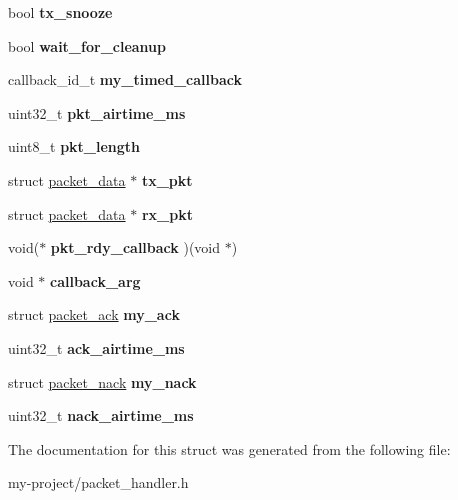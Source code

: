 \begin{DoxyCompactItemize}
bool {\bfseries tx\+\_\+snooze}
\item 
\mbox{\label{structpacket__handler_a2aadb3d86eb35855017bcd6d8691ff3e}} 
bool {\bfseries wait\+\_\+for\+\_\+cleanup}
\item 
\mbox{\label{structpacket__handler_abbef57602dd517871e774e639135ce30}} 
callback\+\_\+id\+\_\+t {\bfseries my\+\_\+timed\+\_\+callback}
\item 
\mbox{\label{structpacket__handler_af9c15e3494d3d3eb7a47d45b69862ebf}} 
uint32\+\_\+t {\bfseries pkt\+\_\+airtime\+\_\+ms}
\item 
\mbox{\label{structpacket__handler_a4292ab96a00dc1506d1cc38fb71fb8d6}} 
uint8\+\_\+t {\bfseries pkt\+\_\+length}
\item 
\mbox{\label{structpacket__handler_a99f8392fa43c323721b74248145ef4c1}} 
struct \mbox{\hyperlink{structpacket__data}{packet\+\_\+data}} $\ast$ {\bfseries tx\+\_\+pkt}
\item 
\mbox{\label{structpacket__handler_a96345738c741593283b450e46f843ed5}} 
struct \mbox{\hyperlink{structpacket__data}{packet\+\_\+data}} $\ast$ {\bfseries rx\+\_\+pkt}
\item 
\mbox{\label{structpacket__handler_aebe312664f54e146c3ebb4dec8371091}} 
void($\ast$ {\bfseries pkt\+\_\+rdy\+\_\+callback} )(void $\ast$)
\item 
\mbox{\label{structpacket__handler_a3fd559111595eaa1fcc500d94ee767b7}} 
void $\ast$ {\bfseries callback\+\_\+arg}
\item 
\mbox{\label{structpacket__handler_a9a9807acb460e1501faeead198c71f2d}} 
struct \mbox{\hyperlink{structpacket__ack}{packet\+\_\+ack}} {\bfseries my\+\_\+ack}
\item 
\mbox{\label{structpacket__handler_a53112d021d2572b745b50d2b4f2a6b5d}} 
uint32\+\_\+t {\bfseries ack\+\_\+airtime\+\_\+ms}
\item 
\mbox{\label{structpacket__handler_a895701b8c6b074c92ec404167983ff8a}} 
struct \mbox{\hyperlink{structpacket__nack}{packet\+\_\+nack}} {\bfseries my\+\_\+nack}
\item 
\mbox{\label{structpacket__handler_a7a309108dc7426e425041b842ef052c7}} 
uint32\+\_\+t {\bfseries nack\+\_\+airtime\+\_\+ms}
\end{DoxyCompactItemize}


The documentation for this struct was generated from the following file\+:\begin{DoxyCompactItemize}
\item 
my-\/project/packet\+\_\+handler.\+h\end{DoxyCompactItemize}
